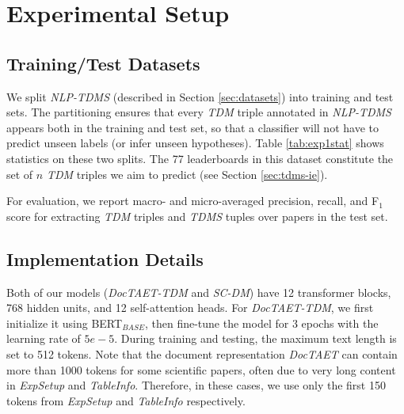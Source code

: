 \documentclass[11pt,a4paper]{article}
\newcommand{\fb}[1]{[FB:#1]}
\begin{document}
\section{Experimental Setup}\label{sec:exp_setup}
\subsection{Training/Test Datasets}
We split \emph{NLP-TDMS} (described in Section \ref{sec:datasets}) into training and test sets. 
The partitioning ensures that every \emph{TDM} triple annotated in \emph{NLP-TDMS} appears both in the training and test set, so that a classifier will not have to predict unseen labels (or infer unseen hypotheses).
Table \ref{tab:exp1stat} shows statistics on these two splits.
The 77 leaderboards in this dataset constitute the set of $n$ \emph{TDM} triples we aim to predict (see Section \ref{sec:tdms-ie}). 

For evaluation, we report macro- and micro-averaged precision, recall, and F$_1$ score for extracting \emph{TDM} triples and \emph{TDMS} tuples over papers in the test set.
\begin{comment}
\fb{cj: not sure the following is needed}
Since this output could ultimately be used to generate a leaderboard, i.e., a ranked list of papers ordered by performance, it seems natural to measure how close our generated leaderboards are to manually curated ones using some rank correlation (e.g., Spearman's $\rho$ or Kendall's $\tau$).
However, rank correlations are typically used when the order of the ranking is defined by the system, e.g., some relevance, similarity, or confidence score. 
In this work, the score is extracted from the paper and not any reflection of our system's confidence.
With a rank correlation it would be possible to have two systems that both make one error in labeling, but that get different scores because of the arbitrary position in which the mistake was made.
\end{comment}





\subsection{Implementation Details}\label{sec:nn_detail}
Both of our models (\emph{DocTAET-TDM} and \emph{SC-DM}) have 12 transformer blocks, 768 hidden units, and 12 self-attention heads.
For \emph{DocTAET-TDM},
we first  initialize it using BERT$_{BASE}$, then fine-tune the model for 3 epochs with the learning rate of $5e-5$.
During training and testing,  the maximum text length is set to 512 tokens.
Note that the document representation \emph{DocTAET} can contain more than 1000 tokens for some scientific papers, often due to very long content in \emph{ExpSetup} and \emph{TableInfo}. 
Therefore, in these cases, we use only the first 150 tokens from \emph{ExpSetup} and \emph{TableInfo} respectively.
\end{document}
